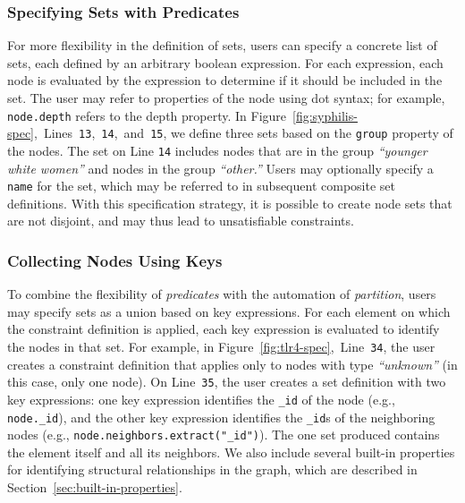 \subsubsection{Specifying Sets with Predicates}
For more flexibility in the definition of sets, users
can specify a concrete list of sets, each defined by an arbitrary boolean
expression. For each expression, each node is evaluated by the expression
to determine if it should be included in the set. The user may
refer to properties of the node using dot syntax; for example,
\texttt{node.depth} refers to the depth property. In 
Figure~\ref{fig:syphilis-spec},~Lines~\texttt{13},~\texttt{14},~and~\texttt{15},
we define three sets based on the \texttt{group} property of the nodes.
The set on Line \texttt{14} includes nodes that are in the group 
\emph{``younger white women''} and nodes in the group \emph{``other.''}
Users may optionally specify a \texttt{name} for the set, which may be 
referred to in subsequent composite set definitions. With this specification 
strategy, it is possible to create node sets that are not disjoint, 
and may thus lead to unsatisfiable constraints.

\subsubsection{Collecting Nodes Using Keys}
To combine the flexibility of \emph{predicates} with the automation of 
\emph{partition}, users may specify sets as a union based on key expressions.
For each element on which the constraint definition is applied, each key expression is
evaluated to identify the nodes in that set.
For example, in Figure~\ref{fig:tlr4-spec},~Line~\texttt{34}, the 
user creates a constraint definition that applies only to nodes with type
\emph{``unknown''} (in this case, only one node). On Line~\texttt{35}, the user 
creates a set definition with two key expressions: one key expression identifies
the \texttt{\_id} of the node (e.g., \texttt{node.\_id}), and the other 
key expression identifies the \texttt{\_id}s of the neighboring nodes 
(e.g., \texttt{node.neighbors.extract("\_id")}). The one set produced
contains the element itself and all its neighbors. We also include several 
built-in properties for identifying structural relationships in the 
graph, which are described in Section~\ref{sec:built-in-properties}.

